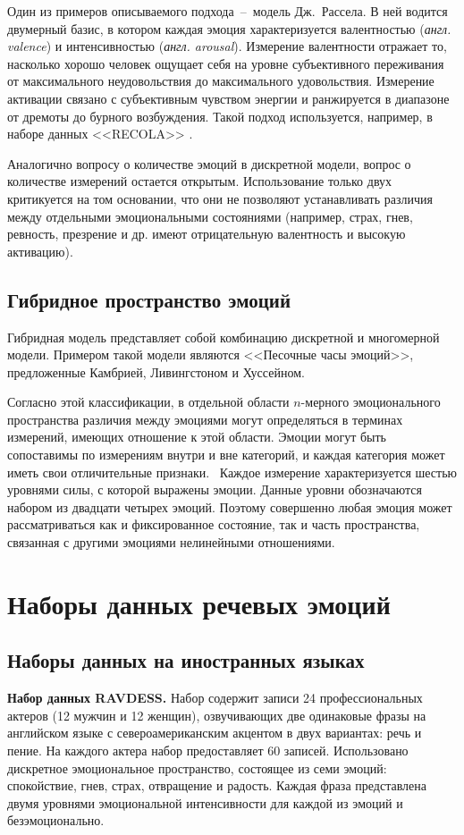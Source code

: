 Один из примеров описываемого подхода~--~модель Дж.~Рассела. В ней водится двумерный базис, в котором каждая эмоция характеризуется валентностью (\textit{англ. valence}) и интенсивностью (\textit{англ. arousal}). Измерение валентности отражает то,
насколько хорошо человек ощущает себя на уровне субъективного переживания от максимального неудовольствия до максимального удовольствия. Измерение активации связано с
субъективным чувством энергии и ранжируется в диапазоне от дремоты до бурного возбуждения. Такой подход используется, например, в наборе данных <<RECOLA>> \cite{RECOLA}.

Аналогично вопросу о количестве эмоций в дискретной модели, вопрос о количестве измерений остается открытым. Использование только двух критикуется на том основании, что они не позволяют устанавливать различия между отдельными эмоциональными состояниями (например, страх, гнев, ревность, презрение и др. имеют отрицательную валентность и высокую активацию).

\subsection{Гибридное пространство эмоций}
Гибридная модель представляет собой комбинацию дискретной и многомерной модели. Примером такой модели являются <<Песочные часы эмоций>>, предложенные Камбрией, Ливингстоном и Хуссейном.~\cite{hourglass} 

Согласно этой классификации, в отдельной области $n$-мерного эмоционального пространства различия между эмоциями могут определяться в терминах измерений, имеющих отношение к этой области. Эмоции могут быть сопоставимы по измерениям внутри и вне категорий, и каждая категория может иметь свои отличительные признаки.~\cite{Russell2003} Каждое измерение характеризуется шестью уровнями силы, с которой выражены эмоции. Данные уровни обозначаются набором из двадцати четырех эмоций. Поэтому совершенно любая эмоция может рассматриваться как и фиксированное состояние, так и часть пространства, связанная с другими эмоциями нелинейными отношениями. 

\section{Наборы данных речевых эмоций}
\subsection{Наборы данных на иностранных языках}
\textbf{Набор данных RAVDESS.} \cite{ravdess} Набор содержит записи 24 профессиональных актеров (12 мужчин и 12 женщин), озвучивающих две одинаковые фразы на английском языке с североамериканским акцентом в двух вариантах: речь и пение. На каждого актера набор предоставляет 60 записей. Использовано дискретное эмоциональное пространство, состоящее из семи эмоций: спокойствие, гнев, страх, отвращение и радость. Каждая фраза представлена двумя уровнями эмоциональной интенсивности для каждой из эмоций и безэмоционально. 

